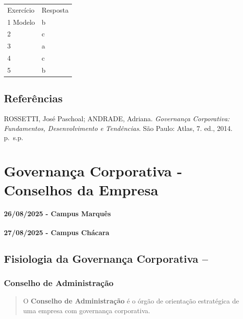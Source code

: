 \documentclass[
]{book}
\begin{document}
\begin{longtable}[]{@{}ll@{}}
\toprule\noalign{}
\endhead
\bottomrule\noalign{}
\endlastfoot
Exercício & Resposta \\
1 Modelo & b \\
2 & c \\
3 & a \\
4 & c \\
5 & b \\
\end{longtable}

\section{Referências}\label{referuxeancias-1}

ROSSETTI, José Paschoal; ANDRADE, Adriana. \emph{Governança Corporativa: Fundamentos, Desenvolvimento e Tendências}. São Paulo: Atlas, 7. ed., 2014. p.~s.p.

\chapter{Governança Corporativa - Conselhos da Empresa}\label{governanuxe7a-corporativa---conselhos-da-empresa}

\subsubsection*{26/08/2025 - Campus Marquês}\label{campus-marquuxeas-3}

\subsubsection*{27/08/2025 - Campus Chácara}\label{campus-chuxe1cara-3}

\section{Fisiologia da Governança Corporativa --}\label{fisiologia-da-governanuxe7a-corporativa}

\subsection{Conselho de Administração}\label{conselho-de-administrauxe7uxe3o}

\begin{quote}
O \textbf{Conselho de Administração} é o órgão de orientação estratégica de uma empresa com governança corporativa.
\end{quote}
\end{document}
